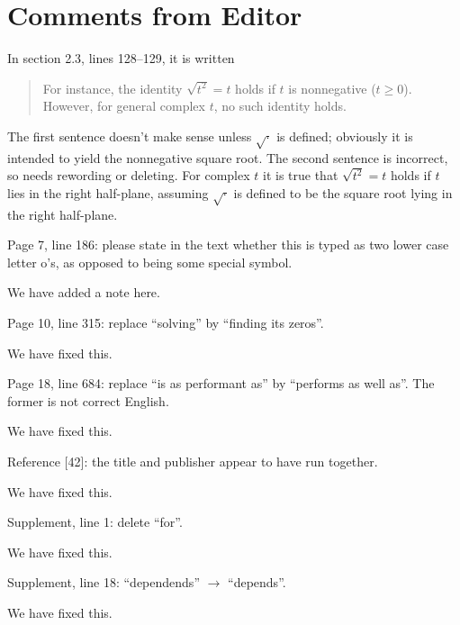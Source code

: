 \documentclass[answers,12pt]{exam}
\begin{document}


\section{Comments from Editor}

\begin{questions}
\question  In section 2.3, lines 128–129, it is written
\begin{quote}
For instance, the identity $\sqrt{t^2} = t$ holds if $t$ is nonnegative ($t \geq
0$). However, for general complex $t$, no such identity holds.
\end{quote}
The first sentence doesn't make sense unless $\sqrt{\cdot}$ is defined;
obviously it is intended to yield the nonnegative square root. The second
sentence is incorrect, so needs rewording or deleting. For complex $t$ it is
true that $\sqrt{t^2} = t$ holds if $t$ lies in the right half-plane, assuming
$\sqrt{\cdot}$ is defined to be the square root lying in the right half-plane.
\begin{solution}

\end{solution}

\question Page 7, line 186: please state in the text whether this is typed as two lower case letter o's, as opposed to being some special symbol.
\begin{solution}
We have added a note here.
\end{solution}

\question Page 10, line 315: replace ``solving'' by ``finding its zeros''.
\begin{solution}
We have fixed this.
\end{solution}

\question Page 18, line 684: replace ``is as performant as'' by ``performs as well as''. The former is not correct English.
\begin{solution}
We have fixed this.
\end{solution}

\question Reference [42]: the title and publisher appear to have run together.
\begin{solution}
We have fixed this.
\end{solution}

\question Supplement, line 1: delete ``for''.
\begin{solution}
We have fixed this.
\end{solution}

\question Supplement, line 18: ``dependends'' $\rightarrow$ ``depends''.
\begin{solution}
We have fixed this.
\end{solution}

\end{questions}
\end{document}
